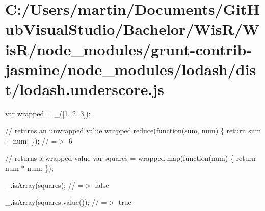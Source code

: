 \hypertarget{_c_1_2_users_2martin_2_documents_2_git_hub_visual_studio_2_bachelor_2_wis_r_2_wis_r_2node_module7177f8a9b7ba50c68ab6568b5f38636b}{}\section{C\+:/\+Users/martin/\+Documents/\+Git\+Hub\+Visual\+Studio/\+Bachelor/\+Wis\+R/\+Wis\+R/node\+\_\+modules/grunt-\/contrib-\/jasmine/node\+\_\+modules/lodash/dist/lodash.\+underscore.\+js}
var wrapped = \+\_\+(\mbox{[}1, 2, 3\mbox{]});

// returns an unwrapped value wrapped.\+reduce(function(sum, num) \{ return sum + num; \}); // =$>$ 6

// returns a wrapped value var squares = wrapped.\+map(function(num) \{ return num $\ast$ num; \});

\+\_\+.\+is\+Array(squares); // =$>$ false

\+\_\+.\+is\+Array(squares.\+value()); // =$>$ true


